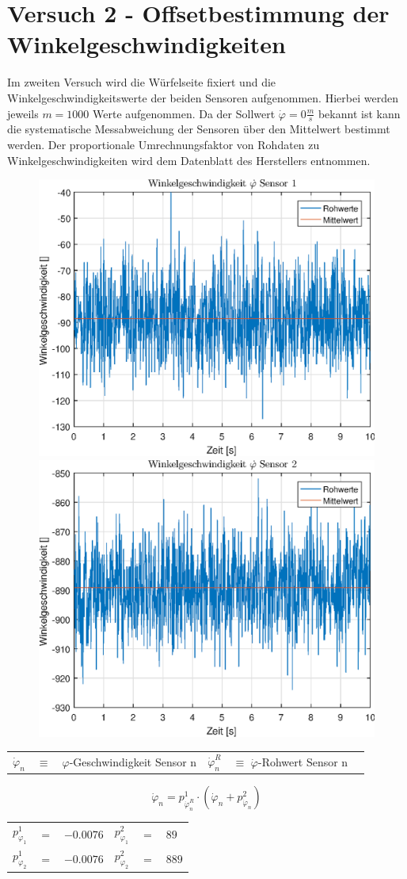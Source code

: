 \section{Versuch 2 - Offsetbestimmung der Winkelgeschwindigkeiten}
Im zweiten Versuch wird die Würfelseite fixiert und die Winkelgeschwindigkeitswerte der beiden Sensoren aufgenommen. Hierbei werden jeweils $m = 1000$ Werte aufgenommen. Da der Sollwert $\dot{\varphi} = 0 \frac{m}{s}$ bekannt ist kann die systematische Messabweichung der Sensoren über den Mittelwert bestimmt werden. Der proportionale Umrechnungsfaktor von Rohdaten zu Winkelgeschwindigkeiten wird dem Datenblatt des Herstellers entnommen.

\begin{figure}[h]
	\includegraphics[width=0.5\linewidth]{img/phi1__d.eps}
	\includegraphics[width=0.5\linewidth]{img/phi2__d.eps}
\end{figure}

\begin{table}[h]
\centering
\begin{tabular}{lcllcl}
$\dot{\varphi}_n$ & $\equiv$ & $\varphi$-Geschwindigkeit Sensor n & $\dot{\varphi}^R_n$ & $\equiv$ $\dot{\varphi}$-Rohwert Sensor n
\end{tabular}
\end{table}

\begin{equation}
\dot{\varphi}_n = p^1_{\dot{\varphi}^R_n}  \cdot (\dot{\varphi}_n + p^2_{\dot{\varphi}_n})
\end{equation}

\begin{table}[h]
\centering
\begin{tabular}{lcllcl}
$p^1_{\varphi_1}$ &$=$& $-0.0076$ & $p^2_{\varphi_1}$ &$=$& $89$ \\
$p^1_{\varphi_2}$ &$=$& $-0.0076$ & $p^2_{\varphi_2}$ &$=$& $889$ \\
\end{tabular}
\end{table}